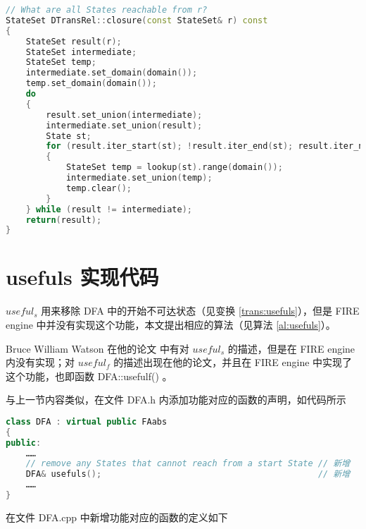 \lstset{style=mystyle}
\begin{lstlisting}[language=C++,label={lst:SReachable-imp},caption={文件 DTransRel.cpp}]
// What are all States reachable from r?
StateSet DTransRel::closure(const StateSet& r) const
{
    StateSet result(r);
    StateSet intermediate;
    StateSet temp;
    intermediate.set_domain(domain());
    temp.set_domain(domain());
    do
    {
        result.set_union(intermediate);
        intermediate.set_union(result);
        State st;
        for (result.iter_start(st); !result.iter_end(st); result.iter_next(st))
        {
            StateSet temp = lookup(st).range(domain());
            intermediate.set_union(temp);
            temp.clear();
        }
    } while (result != intermediate);
    return(result);
}
\end{lstlisting}

\section{usefuls 实现代码}\label{sec:usefulfs-imp}

$useful_s$ 用来移除 DFA 中的开始不可达状态（见变换 \ref{trans:usefuls}），但是 FIRE engine 中并没有实现这个功能，本文提出相应的算法（见算法 \ref{al:usefuls}）。

\begin{remark}
    Bruce William Watson 在他的论文 \cite{watson1993taxonomyb} 中有对 $useful_s$ 的描述，但是在 FIRE engine 内没有实现；对 $useful_f$ 的描述出现在他的论文\cite[注释 2.39]{watson1993taxonomya}，并且在 FIRE engine 中实现了这个功能，也即函数 DFA::usefulf() 。
\end{remark}

与上一节内容类似，在文件 DFA.h 内添加功能对应的函数的声明，如代码所示

\begin{lstlisting}[language=C++,label={lst:usefuls-def},caption={文件 DFA.h}]
class DFA : virtual public FAabs
{
public:
    ……
    // remove any States that cannot reach from a start State // 新增
	DFA& usefuls();                                           // 新增
    ……
}
\end{lstlisting}

在文件 DFA.cpp 中新增功能对应的函数的定义如下


